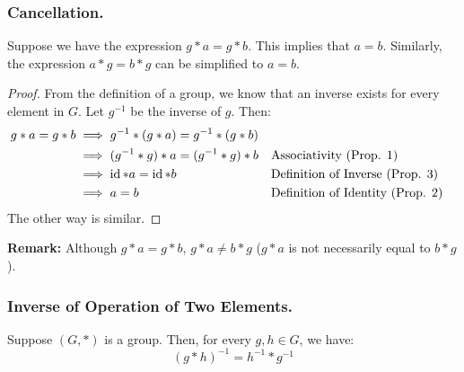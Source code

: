 \documentclass[letterpaper]{article}
\begin{document}
\subsubsection{Cancellation.}
Suppose we have the expression $g * a = g * b$. This implies that $a = b$. Similarly, the expression $a * g = b * g$ can be simplified to $a = b$. 

\begin{mdframed}
    \begin{proof}
        From the definition of a group, we know that an inverse exists for every element in $G$. Let $g^{-1}$ be the inverse of $g$. Then:
        \begin{equation*}
            \begin{aligned}
                g * a = g * b &\implies g^{-1} * (g * a) = g^{-1} * (g * b) \\
                    &\implies (g^{-1} * g) * a = (g^{-1} * g) * b && \text{Associativity (Prop. 1)} \\
                    &\implies \operatorname{id} * a = \operatorname{id} * b && \text{Definition of Inverse (Prop. 3)} \\  
                    &\implies a = b && \text{Definition of Identity (Prop. 2)}
            \end{aligned}
        \end{equation*}
        The other way is similar. 
    \end{proof}
\end{mdframed}

\textbf{Remark:} Although $g * a = g * b$, $g * a \neq b * g$ ($g * a$ is not necessarily equal to $b * g$). 

\subsubsection{Inverse of Operation of Two Elements.}

\begin{lemma}{}{}
    Suppose $(G, *)$ is a group. Then, for every $g, h \in G$, we have: 
    \[(g * h)^{-1} = h^{-1} * g^{-1}\]
\end{lemma}
\end{document}
